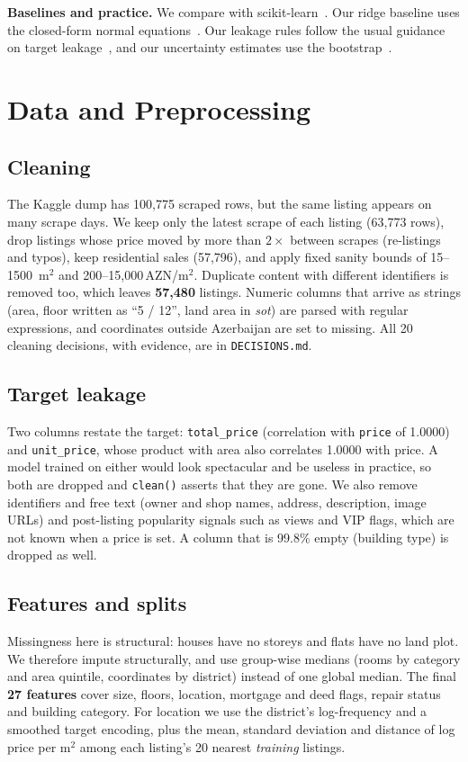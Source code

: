 \documentclass[10pt,twocolumn,a4paper]{article}
\newcommand{\AZN}{\,AZN}
\begin{document}
\textbf{Baselines and practice.} We compare with scikit-learn~\cite{sklearn}.
Our ridge baseline uses the closed-form normal equations~\cite{ridge}. Our
leakage rules follow the usual guidance on target leakage~\cite{leakage},
and our uncertainty estimates use the bootstrap~\cite{bootstrap}.

\section{Data and Preprocessing}
\subsection{Cleaning}
The Kaggle dump has 100{,}775 scraped rows, but the same listing appears on
many scrape days. We keep only the latest scrape of each listing (63{,}773
rows), drop listings whose price moved by more than $2\times$ between scrapes
(re-listings and typos), keep residential sales (57{,}796), and apply fixed
sanity bounds of 15--1500~m$^2$ and 200--15{,}000\AZN/m$^2$. Duplicate
content with different identifiers is removed too, which leaves
\textbf{57{,}480} listings. Numeric columns that arrive as strings (area,
floor written as ``5 / 12'', land area in \emph{sot}) are parsed with regular
expressions, and coordinates outside Azerbaijan are set to missing. All 20
cleaning decisions, with evidence, are in \texttt{DECISIONS.md}.

\subsection{Target leakage}
Two columns restate the target: \texttt{total\_price} (correlation with
\texttt{price} of 1.0000) and \texttt{unit\_price}, whose product with
area also correlates 1.0000 with price. A model trained on either would look
spectacular and be useless in practice, so both are dropped and \texttt{clean()}
asserts that they are gone. We also remove identifiers and free text (owner
and shop names, address, description, image URLs) and post-listing popularity
signals such as views and VIP flags, which are not known when a price is set.
A column that is 99.8\% empty (building type) is dropped as well.

\subsection{Features and splits}
Missingness here is structural: houses have no storeys and flats have no land
plot. We therefore impute structurally, and use group-wise medians (rooms by
category and area quintile, coordinates by district) instead of one global
median. The final \textbf{27 features} cover size, floors, location,
mortgage and deed flags, repair status and building category. For
location we use the district's log-frequency and a smoothed target
encoding, plus the mean, standard deviation and distance of log price per
m$^2$ among each listing's 20 nearest \emph{training} listings.
\end{document}
